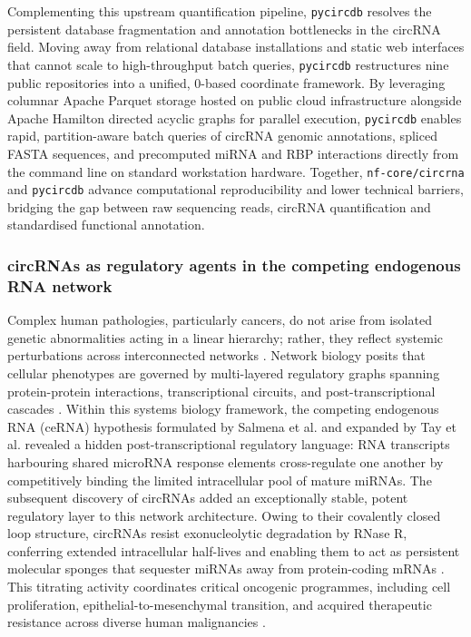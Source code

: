 Complementing this upstream quantification pipeline, \texttt{pycircdb} resolves the persistent database fragmentation and annotation bottlenecks in the circRNA field. Moving away from relational database installations and static web interfaces that cannot scale to high-throughput batch queries, \texttt{pycircdb} restructures nine public repositories into a unified, 0-based coordinate framework. By leveraging columnar Apache Parquet storage hosted on public cloud infrastructure alongside Apache Hamilton directed acyclic graphs for parallel execution, \texttt{pycircdb} enables rapid, partition-aware batch queries of circRNA genomic annotations, spliced FASTA sequences, and precomputed miRNA and RBP interactions directly from the command line on standard workstation hardware. Together, \texttt{nf-core/circrna} and \texttt{pycircdb} advance computational reproducibility and lower technical barriers, bridging the gap between raw sequencing reads, circRNA quantification and standardised functional annotation.

\subsubsection{circRNAs as regulatory agents in the competing endogenous RNA network}
Complex human pathologies, particularly cancers, do not arise from isolated genetic abnormalities acting in a linear hierarchy; rather, they reflect systemic perturbations across interconnected networks \cite{Barabasi2011Jan, Ideker2012Jan}. Network biology posits that cellular phenotypes are governed by multi-layered regulatory graphs spanning protein-protein interactions, transcriptional circuits, and post-transcriptional cascades \cite{Califano2011Jan, Anastasiadou2018Jan}. Within this systems biology framework, the competing endogenous RNA (ceRNA) hypothesis formulated by Salmena et al. \cite{Salmena2011Aug} and expanded by Tay et al. \cite{Tay2014Aug} revealed a hidden post-transcriptional regulatory language: RNA transcripts harbouring shared microRNA response elements cross-regulate one another by competitively binding the limited intracellular pool of mature miRNAs. The subsequent discovery of circRNAs added an exceptionally stable, potent regulatory layer to this network architecture. Owing to their covalently closed loop structure, circRNAs resist exonucleolytic degradation by RNase R, conferring extended intracellular half-lives and enabling them to act as persistent molecular sponges that sequester miRNAs away from protein-coding mRNAs \cite{Salzman2012, Li2015Aug, Hansen2013Mar, Denzler2014Jun, Conn2024Sep}. This titrating activity coordinates critical oncogenic programmes, including cell proliferation, epithelial-to-mesenchymal transition, and acquired therapeutic resistance across diverse human malignancies \cite{Kristensen2019Nov, Hsiao2017, Lim2021Dec}.

